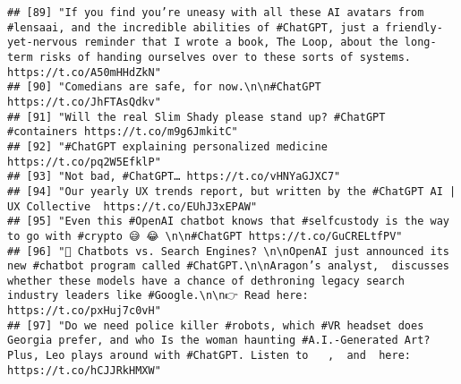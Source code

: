 \documentclass[
]{article}
\begin{document}
\begin{verbatim}
## [89] "If you find you’re uneasy with all these AI avatars from #lensaai, and the incredible abilities of #ChatGPT, just a friendly-yet-nervous reminder that I wrote a book, The Loop, about the long-term risks of handing ourselves over to these sorts of systems. https://t.co/A50mHHdZkN"                                              
## [90] "Comedians are safe, for now.\n\n#ChatGPT https://t.co/JhFTAsQdkv"                                                                                                                                                                                                                                                                     
## [91] "Will the real Slim Shady please stand up? #ChatGPT #containers https://t.co/m9g6JmkitC"                                                                                                                                                                                                                                               
## [92] "#ChatGPT explaining personalized medicine https://t.co/pq2W5EfklP"                                                                                                                                                                                                                                                                    
## [93] "Not bad, #ChatGPT… https://t.co/vHNYaGJXC7"                                                                                                                                                                                                                                                                                           
## [94] "Our yearly UX trends report, but written by the #ChatGPT AI | UX Collective  https://t.co/EUhJ3xEPAW"                                                                                                                                                                                                                                 
## [95] "Even this #OpenAI chatbot knows that #selfcustody is the way to go with #crypto 😅 😂 \n\n#ChatGPT https://t.co/GuCRELtfPV"                                                                                                                                                                                                           
## [96] "🔎 Chatbots vs. Search Engines? \n\nOpenAI just announced its new #chatbot program called #ChatGPT.\n\nAragon’s analyst,  discusses whether these models have a chance of dethroning legacy search industry leaders like #Google.\n\n👉 Read here: https://t.co/pxHuj7c0vH"                                                           
## [97] "Do we need police killer #robots, which #VR headset does Georgia prefer, and who Is the woman haunting #A.I.-Generated Art? Plus, Leo plays around with #ChatGPT. Listen to   ,  and  here: https://t.co/hCJJRkHMXW"
\end{verbatim}
\end{document}
